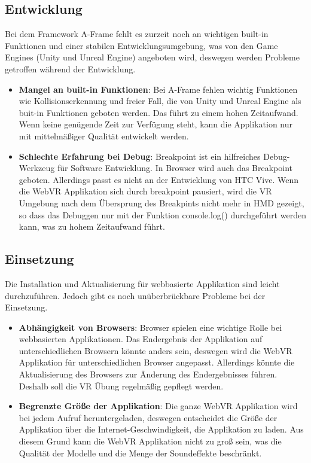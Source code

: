 \subsection{Entwicklung}

Bei dem Framework A-Frame fehlt es zurzeit noch an wichtigen built-in Funktionen und einer stabilen Entwicklungsumgebung, was von den Game Engines (Unity und Unreal Engine) angeboten wird, deswegen werden Probleme getroffen während der Entwicklung. 

\begin{itemize}
    \item \textbf{Mangel an built-in Funktionen}: Bei A-Frame fehlen wichtig Funktionen wie Kollisionserkennung und freier Fall, die von Unity und Unreal Engine als buit-in Funktionen geboten werden. Das führt zu einem hohen Zeitaufwand. Wenn keine genügende Zeit zur Verfügung steht, kann die Applikation nur mit mittelmäßiger Qualität entwickelt werden.
    
    \item \textbf{Schlechte Erfahrung bei Debug}: Breakpoint ist ein hilfreiches Debug-Werkzeug für Software Entwicklung. In Browser wird auch das Breakpoint geboten. Allerdings passt es nicht an der Entwicklung von HTC Vive. Wenn die WebVR Applikation sich durch breakpoint pausiert, wird die VR Umgebung nach dem Übersprung des Breakpints nicht mehr in HMD gezeigt, so dass das Debuggen nur mit der Funktion {\selectfont console.log()} durchgeführt werden kann, was zu hohem Zeitaufwand führt.
    
\end{itemize}

\subsection{Einsetzung}

Die Installation und Aktualisierung für webbasierte Applikation sind leicht durchzuführen. Jedoch gibt es noch unüberbrückbare Probleme bei der Einsetzung.

\begin{itemize}
    \item \textbf{Abhängigkeit von Browsers}: Browser spielen eine wichtige Rolle bei webbasierten Applikationen. Das Endergebnis der Applikation auf unterschiedlichen Browsern könnte anders sein, deswegen wird die WebVR Applikation für unterschiedlichen Browser angepasst. Allerdings könnte die Aktualisierung des Browsers zur Änderung des Endergebnisses führen. Deshalb soll die VR Übung regelmäßig gepflegt werden.
    
    \item \textbf{Begrenzte Größe der Applikation}: Die ganze WebVR Applikation wird bei jedem Aufruf heruntergeladen, deswegen entscheidet die Größe der Applikation über die Internet-Geschwindigkeit, die Applikation zu laden. Aus diesem Grund kann die WebVR Applikation nicht zu groß sein, was die Qualität der Modelle und die Menge der Soundeffekte beschränkt.
\end{itemize}


